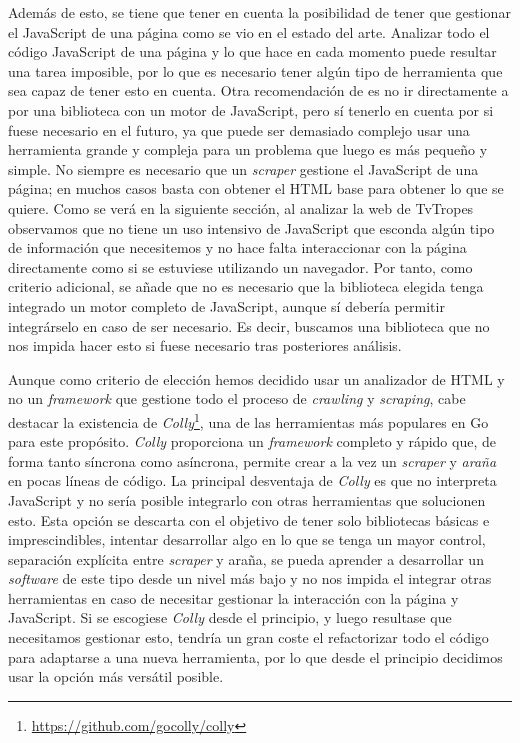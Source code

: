 Además de esto, se tiene que tener en cuenta la posibilidad de tener que
gestionar el JavaScript de una página como se vio en el estado del arte.
Analizar todo el código JavaScript de una página y lo que hace en cada momento
puede resultar una tarea imposible, por lo que es necesario tener algún tipo de
herramienta que sea capaz de tener esto en cuenta. Otra recomendación de
\cite{apress2018scraping} es no ir directamente a por una biblioteca con un
motor de JavaScript, pero sí tenerlo en cuenta por si fuese necesario en el
futuro, ya que puede ser demasiado complejo usar una herramienta grande y
compleja para un problema que luego es más pequeño y simple. No siempre es
necesario que un \textit{scraper} gestione el JavaScript de una página; en
muchos casos basta con obtener el HTML base para obtener lo que se quiere. Como
se verá en la siguiente sección, al analizar la web de TvTropes observamos que
no tiene un uso intensivo de JavaScript que esconda algún tipo de información
que necesitemos y no hace falta interaccionar con la página directamente como si
se estuviese utilizando un navegador. Por tanto, como criterio adicional, se
añade que no es necesario que la biblioteca elegida tenga integrado un motor
completo de JavaScript, aunque sí debería permitir integrárselo en caso de ser
necesario. Es decir, buscamos una biblioteca que no nos impida hacer esto si
fuese necesario tras posteriores análisis.

Aunque como criterio de elección hemos decidido usar un analizador de HTML y no
un \textit{framework} que gestione todo el proceso de \textit{crawling} y
\textit{scraping}, cabe destacar la existencia de
\textit{Colly}\footnote{\url{https://github.com/gocolly/colly}}, una de las
herramientas más populares en Go para este propósito. \textit{Colly} proporciona
un \textit{framework} completo y rápido que, de forma tanto síncrona como
asíncrona, permite crear a la vez un \textit{scraper} y \textit{araña} en pocas
líneas de código. La principal desventaja de \textit{Colly} es que no interpreta
JavaScript y no sería posible integrarlo con otras herramientas que solucionen
esto. Esta opción se descarta con el objetivo de tener solo bibliotecas básicas
e imprescindibles, intentar desarrollar algo en lo que se tenga un mayor
control, separación explícita entre \textit{scraper} y araña, se pueda aprender
a desarrollar un \textit{software} de este tipo desde un nivel más bajo y no nos
impida el integrar otras herramientas en caso de necesitar gestionar la
interacción con la página y JavaScript. Si se escogiese \textit{Colly} desde el
principio, y luego resultase que necesitamos gestionar esto, tendría un gran
coste el refactorizar todo el código para adaptarse a una nueva herramienta, por
lo que desde el principio decidimos usar la opción más versátil posible.

